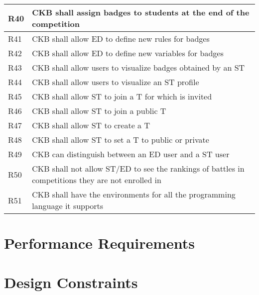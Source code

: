 \begin{longtable}{|p{3cm}|p{10cm}|}
        \hline
        R40 & CKB shall assign badges to students at the end of the competition \\
        \hline
        R41 & CKB shall allow ED to define new rules for badges \\
        \hline
        R42 & CKB shall allow ED to define new variables for badges \\
        \hline
        R43 & CKB shall allow users to visualize badges obtained by an ST \\
        \hline
        R44 & CKB shall allow users to visualize an ST profile \\
        \hline
        R45 & CKB shall allow ST to join a T for which is invited \\
        \hline
        R46 & CKB shall allow ST to join a public T \\
        \hline
        R47 & CKB shall allow ST to create a T \\
        \hline
        R48 & CKB shall allow ST to set a T to public or private \\
        \hline
        R49 & CKB can distinguish between an ED user and a ST user \\
        \hline
        R50 & CKB shall not allow ST/ED to see the rankings of battles in competitions they are not enrolled in \\
        \hline
        R51 & CKB shall have the environments for all the programming language it supports \\
        \hline

\end{longtable}




\section{Performance Requirements}
\label{s:Performance_requirements}%

\section{Design Constraints}
\label{s:Design_constraints}%

